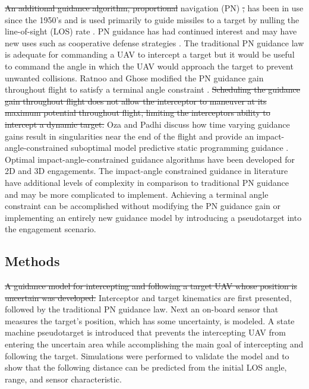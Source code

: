 \documentclass[conference]{IEEEtran}
\providecommand{\DIFadd}[1]{{\protect\color{blue}\uwave{#1}}} %
\providecommand{\DIFdel}[1]{{\protect\color{red}\sout{#1}}}                      %
\providecommand{\DIFaddbegin}{} %
\providecommand{\DIFaddend}{} %
\providecommand{\DIFdelbegin}{} %
\providecommand{\DIFdelend}{} %
\newcommand{\DIFscaledelfig}{0.5}
\newlength{\DIFdelgraphicswidth} %
\newlength{\DIFdelgraphicsheight} %
\newcommand{\DIFaddincludegraphics}[2][]{{\color{blue}\fbox{\DIFOincludegraphics[#1]{#2}}}} %
\newcommand{\DIFdelincludegraphics}[2][]{%
\sbox{\DIFdelgraphicsbox}{\DIFOincludegraphics[#1]{#2}}%
\settoboxwidth{\DIFdelgraphicswidth}{\DIFdelgraphicsbox} %
\settoboxtotalheight{\DIFdelgraphicsheight}{\DIFdelgraphicsbox} %
\scalebox{\DIFscaledelfig}{%
\parbox[b]{\DIFdelgraphicswidth}{\usebox{\DIFdelgraphicsbox}\\[-\baselineskip] \rule{\DIFdelgraphicswidth}{0em}}\llap{\resizebox{\DIFdelgraphicswidth}{\DIFdelgraphicsheight}{%
\setlength{\unitlength}{\DIFdelgraphicswidth}%
\begin{picture}(1,1)%
\thicklines\linethickness{2pt} %
{\color[rgb]{1,0,0}\put(0,0){\framebox(1,1){}}}%
{\color[rgb]{1,0,0}\put(0,0){\line( 1,1){1}}}%
{\color[rgb]{1,0,0}\put(0,1){\line(1,-1){1}}}%
\end{picture}%
}\hspace*{3pt}}} %
} %
\DeclareRobustCommand{\DIFaddbegin}{\DIFOaddbegin \let\includegraphics\DIFaddincludegraphics} %
\DeclareRobustCommand{\DIFaddend}{\DIFOaddend \let\includegraphics\DIFOincludegraphics} %
\DeclareRobustCommand{\DIFdelbegin}{\DIFOdelbegin \let\includegraphics\DIFdelincludegraphics} %
\DeclareRobustCommand{\DIFdelend}{\DIFOaddend \let\includegraphics\DIFOincludegraphics} %
\begin{document}
\DIFdelbegin \DIFdel{An additional guidance algorithm, proportional }\DIFdelend \DIFaddbegin \DIFadd{Proportional }\DIFaddend navigation (PN) \DIFdelbegin \DIFdel{, }\DIFdelend has been in use since the 1950's \cite{zarchan} and is used primarily to guide missiles to a target by nulling the line-of-sight (LOS) rate \cite{shneydor1998missile,yanushevsky2007modern}. PN guidance has had continued interest and may have new uses such as cooperative defense strategies \cite{isaac}. The traditional PN guidance law is adequate for commanding a UAV to intercept a target but it would be useful to command the angle in which the UAV would approach the target to prevent unwanted collisions. Ratnoo and Ghose modified the PN guidance gain throughout flight to satisfy a terminal angle constraint \cite{ratnoo2009satisfying}. \DIFdelbegin \DIFdel{Scheduling the guidance gain throughout flight does not allow the interceptor to maneuver at its maximum potential throughout flight, limiting the interceptors ability to intercept a dynamic target. }\DIFdelend Oza and Padhi discuss how time varying guidance gains result in singularities near the end of the flight and provide an impact-angle-constrained suboptimal model predictive static programming guidance \cite{oza2012impact}. Optimal impact-angle-constrained guidance algorithms have been developed for 2D \cite{park2013optimal} and 3D \cite{kumar2014three} engagements. The impact-angle constrained guidance in literature have additional levels of complexity in comparison to traditional PN guidance and may be more complicated to implement. Achieving a terminal angle constraint can be accomplished without modifying the PN guidance gain or implementing an entirely new guidance model by introducing a pseudotarget into the engagement scenario.
\DIFdelbegin %
\DIFdelend 



\DIFdelbegin %

\DIFdelend \subsection{Methods}
\DIFdelbegin \DIFdel{A guidance model for intercepting and following a target UAV whose position is uncertain was developed. 
}\DIFdelend Interceptor and target kinematics are first presented, followed by the traditional PN guidance law. Next an on-board sensor that measures the target's position, which has some uncertainty, is modeled. A state machine pseudotarget is introduced that prevents the intercepting UAV from entering the uncertain area while accomplishing the main goal of intercepting and following the target. Simulations were performed to validate the model and to show that the following distance can be predicted from the initial LOS angle, range, and sensor characteristic.
\end{document}
